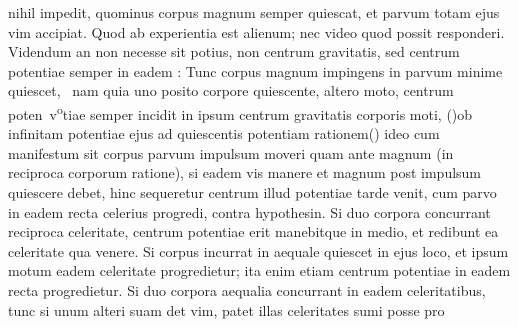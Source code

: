 nihil impedit, quominus corpus magnum semper quiescat, et parvum totam ejus vim accipiat. 
Quod ab experientia est alienum; nec video quod possit responderi. Videndum an non 
necesse sit potius, non centrum gravitatis\protect{}, sed centrum potentiae\protect{} semper in eadem  
: 
%
Tunc corpus magnum impingens in parvum minime quiescet\lbrack,\rbrack\
nam quia uno posito corpore quiescente, altero moto, centrum poten~v\textsuperscript{o}\rbrack tiae semper incidit in ipsum centrum gravitatis\protect{} corporis moti, (\phantom)\hspace*{-1.2mm}ob infinitam potentiae\protect{} ejus ad quiescentis 
potentiam\protect{} rationem\phantom(\hspace*{-1.2mm}) ideo cum manifestum sit corpus parvum impulsum 
% 
%
moveri
quam ante magnum (in reciproca corporum ratione), si eadem vis manere et magnum post 
impulsum quiescere debet, hinc sequeretur centrum illud potentiae\protect{}
%
tarde venit, cum parvo in eadem recta celerius progredi, contra hypothesin. Si duo corpora
concurrant reciproca celeritate, centrum potentiae\protect{} erit manebitque in medio, et redibunt ea celeritate
qua venere. Si corpus incurrat in aequale  
%
%
quiescet in ejus loco, et ipsum 
motum eadem celeritate progredietur; ita enim etiam centrum potentiae\protect{} in eadem recta progredietur.
Si duo corpora aequalia concurrant in eadem 
%
%
celeritatibus, tunc 
si unum alteri suam det vim, patet illas celeritates sumi posse pro
%
